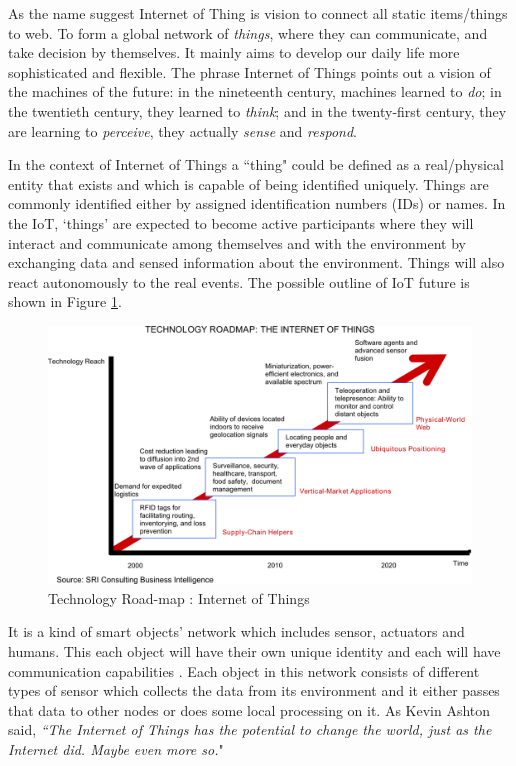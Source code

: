 \documentclass [a4paper,12pt]{book}
\begin{document}
As the name suggest Internet of Thing is vision to connect all static items/things to web. To form a global network of \emph{things}, where they can communicate, and take decision by themselves. It mainly aims to develop our daily life more sophisticated and flexible. The phrase Internet of Things points out a vision of the machines of the future: in the nineteenth century, machines learned to \emph{do}; in the twentieth century, they learned to \emph{think}; and in the twenty-first century, they are learning to \emph{perceive}, they actually \emph{sense} and \emph{respond}. 

In the context of Internet of Things a ``thing" could be defined as a real/physical entity that exists and which is capable of being identified uniquely. Things are commonly identified either by assigned identification numbers (IDs) or names. In the IoT, `things' are expected to become active participants where they will interact and communicate among themselves and with the environment by exchanging data and sensed information about the environment. Things will also react autonomously to the real events. The possible outline of IoT future is shown in Figure \ref{roadmap}.

\vspace{0.5cm}
\begin{figure}[!h]
\begin{center}
\includegraphics[scale=1.36]{images/1.png}
\caption{Technology Road-map : Internet of Things \cite{image_roadmap}}
\label{roadmap}
\end{center}
\end{figure}

It is a kind of smart objects' network which includes sensor, actuators and humans. This each object will have their own unique identity and each will have communication capabilities \cite{2}. Each object in this network consists of different types of sensor which collects the data from its environment and it either passes that data to other nodes or does some local processing on it. As Kevin Ashton said, \emph{``The Internet of Things has the potential to change the world, just as the Internet did. Maybe even more so.}"
\end{document}

